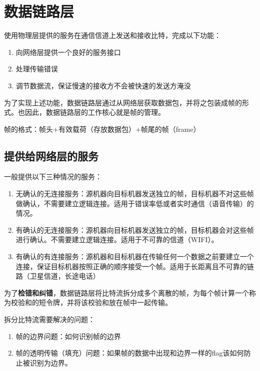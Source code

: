 \section{数据链路层}
使用物理层提供的服务在通信信道上发送和接收比特，完成以下功能：
    \begin{enumerate}
        \item 向网络层提供一个良好的服务接口
        \item 处理传输错误
        \item 调节数据流，保证慢速的接收方不会被快速的发送方淹没
        
    \end{enumerate}	
    为了实现上述功能，数据链路层通过从网络层获取数据包，并将之包装成帧的形式。也因此，数据链路层的工作核心就是帧的管理。
    
    \begin{quotebox}
        帧的格式：帧头+有效载荷（存放数据包）+帧尾的帧（frame）    
    \end{quotebox}
    
    \subsection{提供给网络层的服务}
    一般提供以下三种情况的服务：
    \begin{enumerate}
        \item 无确认的无连接服务：源机器向目标机器发送独立的帧，目标机器不对这些帧做确认，不需要建立逻辑连接。适用于错误率低或者实时通信（语音传输）的情况。
        \item 有确认的无连接服务：源机器向目标机器发送独立的帧，目标机器会对这些帧进行确认。不需要建立逻辑连接。适用于不可靠的信道（WIFI）。
        \item 有确认的有连接服务：源机器和目标机器在传输任何一个数据之前要建立一个连接，保证目标机器按照正确的顺序接受一个帧。适用于长距离且不可靠的链路（卫星信道，长途电话）
    \end{enumerate}
    为了\textbf{检错和纠错}，数据链路层将比特流拆分成多个离散的帧，为每个帧计算一个称为校验和的短令牌，并将该校验和放在帧中一起传输。

    拆分比特流需要解决的问题：
    \begin{enumerate}
        \item 帧的边界问题：如何识别帧的边界
        \item 帧的透明传输（填充）问题：如果帧的数据中出现和边界一样的flag该如何防止被识别为边界。
    \end{enumerate}
    
